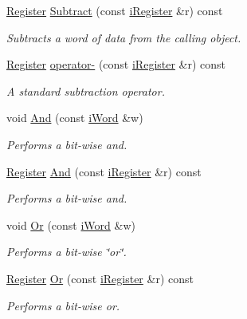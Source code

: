 \begin{DoxyCompactItemize}
\hyperlink{classRegister}{Register} \hyperlink{classRegister_a05132a4a62f5c6883fdf78731970ab6a}{Subtract} (const \hyperlink{classiRegister}{iRegister} \&r) const 
\begin{DoxyCompactList}\small\item\em Subtracts a word of data from the calling object. \item\end{DoxyCompactList}\item 
\hyperlink{classRegister}{Register} \hyperlink{classRegister_a43c957e4b6a3103f0634258891c82b46}{operator-\/} (const \hyperlink{classiRegister}{iRegister} \&r) const 
\begin{DoxyCompactList}\small\item\em A standard subtraction operator. \item\end{DoxyCompactList}\item 
void \hyperlink{classRegister_a312263efb06ef459409879f5119b3b81}{And} (const \hyperlink{classiWord}{iWord} \&w)
\begin{DoxyCompactList}\small\item\em Performs a bit-\/wise and. \item\end{DoxyCompactList}\item 
\hyperlink{classRegister}{Register} \hyperlink{classRegister_af3502239502c214b8c9362a6fd9f8ff8}{And} (const \hyperlink{classiRegister}{iRegister} \&r) const 
\begin{DoxyCompactList}\small\item\em Performs a bit-\/wise and. \item\end{DoxyCompactList}\item 
void \hyperlink{classRegister_ab2f8407fab157d8deea936fa74424115}{Or} (const \hyperlink{classiWord}{iWord} \&w)
\begin{DoxyCompactList}\small\item\em Performs a bit-\/wise \char`\"{}or\char`\"{}. \item\end{DoxyCompactList}\item 
\hyperlink{classRegister}{Register} \hyperlink{classRegister_a9400801cc625144c4606cd7f5cbbaa21}{Or} (const \hyperlink{classiRegister}{iRegister} \&r) const 
\begin{DoxyCompactList}\small\item\em Performs a bit-\/wise or. \item\end{DoxyCompactList}\item 

\end{DoxyCompactItemize}
